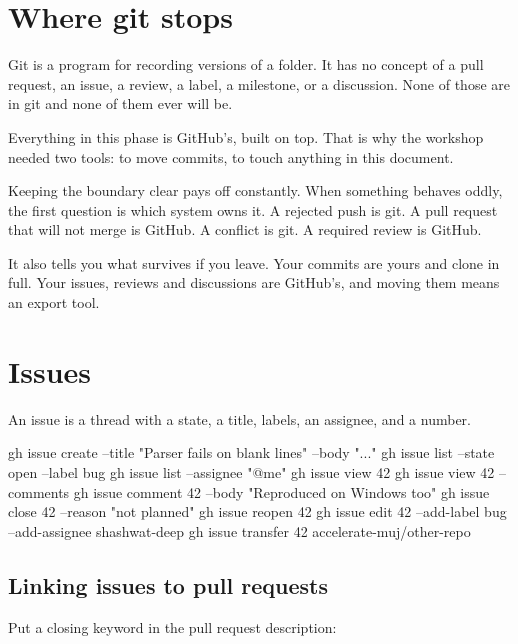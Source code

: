 \documentclass[11pt]{article}
\begin{document}
\maketitlepage

\section{Where git stops}

Git is a program for recording versions of a folder. It has no concept of a pull
request, an issue, a review, a label, a milestone, or a discussion. None of those are
in git and none of them ever will be.

Everything in this phase is GitHub's, built on top. That is why the workshop needed
two tools:  to move commits,  to touch anything in this document.

\begin{why}
Keeping the boundary clear pays off constantly. When something behaves oddly, the
first question is which system owns it. A rejected push is git. A pull request that
will not merge is GitHub. A conflict is git. A required review is GitHub.

It also tells you what survives if you leave. Your commits are yours and clone in
full. Your issues, reviews and discussions are GitHub's, and moving them means an
export tool.
\end{why}

\section{Issues}

An issue is a thread with a state, a title, labels, an assignee, and a number.

\begin{shell}
gh issue create --title "Parser fails on blank lines" --body "..."
gh issue list --state open --label bug
gh issue list --assignee "@me"
gh issue view 42
gh issue view 42 --comments
gh issue comment 42 --body "Reproduced on Windows too"
gh issue close 42 --reason "not planned"
gh issue reopen 42
gh issue edit 42 --add-label bug --add-assignee shashwat-deep
gh issue transfer 42 accelerate-muj/other-repo
\end{shell}

\subsection{Linking issues to pull requests}

Put a closing keyword in the pull request description:

\end{document}
